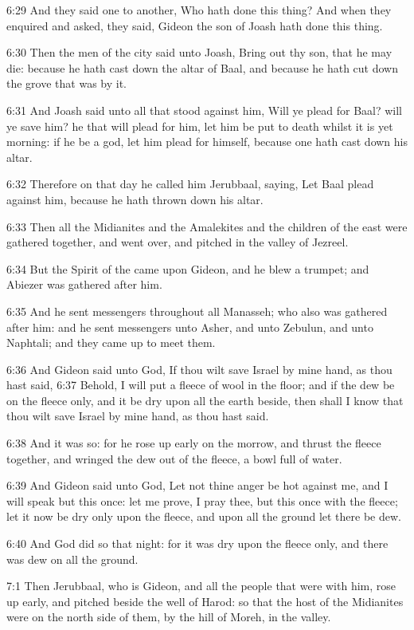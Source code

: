 6:29 And they said one to another, Who hath done this thing? And when they enquired and asked, they said, Gideon the son of Joash hath done this thing.

6:30 Then the men of the city said unto Joash, Bring out thy son, that he may die: because he hath cast down the altar of Baal, and because he hath cut down the grove that was by it.

6:31 And Joash said unto all that stood against him, Will ye plead for Baal? will ye save him? he that will plead for him, let him be put to death whilst it is yet morning: if he be a god, let him plead for himself, because one hath cast down his altar.

6:32 Therefore on that day he called him Jerubbaal, saying, Let Baal plead against him, because he hath thrown down his altar.

6:33 Then all the Midianites and the Amalekites and the children of the east were gathered together, and went over, and pitched in the valley of Jezreel.

6:34 But the Spirit of the \LORD came upon Gideon, and he blew a trumpet; and Abiezer was gathered after him.

6:35 And he sent messengers throughout all Manasseh; who also was gathered after him: and he sent messengers unto Asher, and unto Zebulun, and unto Naphtali; and they came up to meet them.

6:36 And Gideon said unto God, If thou wilt save Israel by mine hand, as thou hast said, 6:37 Behold, I will put a fleece of wool in the floor; and if the dew be on the fleece only, and it be dry upon all the earth beside, then shall I know that thou wilt save Israel by mine hand, as thou hast said.

6:38 And it was so: for he rose up early on the morrow, and thrust the fleece together, and wringed the dew out of the fleece, a bowl full of water.

6:39 And Gideon said unto God, Let not thine anger be hot against me, and I will speak but this once: let me prove, I pray thee, but this once with the fleece; let it now be dry only upon the fleece, and upon all the ground let there be dew.

6:40 And God did so that night: for it was dry upon the fleece only, and there was dew on all the ground.

7:1 Then Jerubbaal, who is Gideon, and all the people that were with him, rose up early, and pitched beside the well of Harod: so that the host of the Midianites were on the north side of them, by the hill of Moreh, in the valley.

